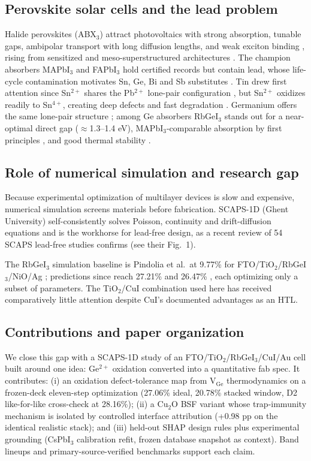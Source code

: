 \documentclass[review]{elsarticle}
\begin{document}
\subsection{Perovskite solar cells and the lead problem}
Halide perovskites (ABX$_{3}$) attract photovoltaics with strong absorption, tunable gaps, ambipolar transport with long diffusion lengths, and weak exciton binding \cite{r7,r8}, rising from sensitized and meso-superstructured architectures \cite{r9,r10}. The champion absorbers MAPbI$_{3}$ and FAPbI$_{3}$ hold certified records \cite{r3} but contain lead, whose life-cycle contamination motivates Sn, Ge, Bi and Sb substitutes \cite{r11,r12}. Tin drew first attention since Sn$^{2+}$ shares the Pb$^{2+}$ lone-pair configuration \cite{r11}, but Sn$^{2+}$ oxidizes readily to Sn$^{4+}$, creating deep defects and fast degradation \cite{r11,r12}. Germanium offers the same lone-pair structure \cite{r13}; among Ge absorbers RbGeI$_{3}$ stands out for a near-optimal direct gap ($\approx$1.3--1.4 eV), MAPbI$_{3}$-comparable absorption by first principles \cite{r13,r17,r18}, and good thermal stability \cite{r14}.

\subsection{Role of numerical simulation and research gap}
Because experimental optimization of multilayer devices is slow and expensive, numerical simulation screens materials before fabrication. SCAPS-1D (Ghent University) self-consistently solves Poisson, continuity and drift-diffusion equations \cite{r19,r20} and is the workhorse for lead-free design, as a recent review of 54 SCAPS lead-free studies confirms \cite{rReview} (see their Fig.~1).

The RbGeI$_{3}$ simulation baseline is Pindolia et al.\ at 9.77\% for FTO/\allowbreak{}TiO$_{2}$/RbGeI$_{3}$/NiO/\allowbreak{}Ag \cite{r14}; predictions since reach 27.21\% \cite{r22} and 26.47\% \cite{r23}, each optimizing only a subset of parameters. The TiO$_{2}$/CuI combination used here has received comparatively little attention despite CuI's documented advantages as an HTL.

\subsection{Contributions and paper organization}
We close this gap with a SCAPS-1D study of an FTO/\allowbreak{}TiO$_{2}$/RbGeI$_{3}$/CuI/\allowbreak{}Au cell built around one idea: Ge$^{2+}$ oxidation converted into a quantitative fab spec. It contributes: (i) an oxidation defect-tolerance map from V$_{\mathrm{Ge}}$ thermodynamics on a frozen-deck eleven-step optimization (27.06\% ideal, 20.78\% stacked window, D2 like-for-like cross-check at 28.16\%); (ii) a Cu$_{2}$O BSF variant whose trap-immunity mechanism is isolated by controlled interface attribution (+0.98 pp on the identical realistic stack); and (iii) held-out SHAP design rules plus experimental grounding (CsPbI$_{3}$ calibration refit, frozen database snapshot as context). Band lineups and primary-source-verified benchmarks support each claim.
\end{document}
